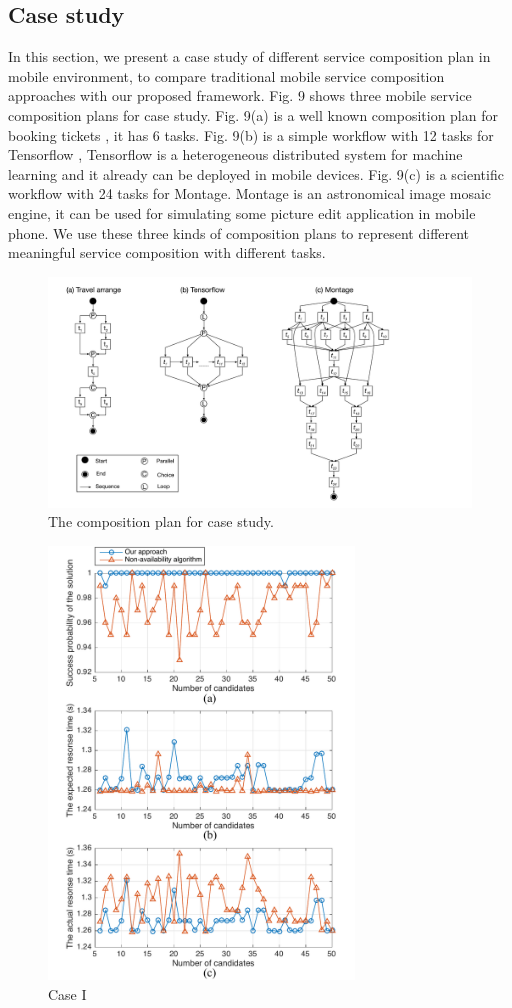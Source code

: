 \documentclass[10pt,journal,compsoc]{IEEEtran}
\begin{document}
\subsection{Case study}
In this section, we present a case study of different service composition plan in mobile environment, to compare traditional mobile service composition approaches with our proposed framework. Fig. 9 shows three mobile service composition plans for case study. Fig. 9(a) is a well known composition plan for booking tickets \cite{wu2013transactional}, it has 6 tasks. Fig. 9(b) is a simple workflow with 12 tasks for Tensorflow \cite{abadi2016tensorflow}, Tensorflow is a heterogeneous distributed system for machine learning and it already can be deployed in mobile devices. Fig. 9(c) is a scientific workflow with 24 tasks for Montage. Montage is an astronomical image mosaic engine, it can be used for simulating some picture edit application in mobile phone. We use these three kinds of composition plans to represent different meaningful service composition with different tasks.

\begin{figure}[!t]
\centering
\includegraphics[width=5in]{./img/DAG.pdf}
\caption{The composition plan for case study.}
\label{fig_DAG}
\end{figure}



\begin{figure}[!t]
\centering
\includegraphics[width=3.2in]{./img/Task-6.pdf}
\caption{Case I}
\label{Task-6}
\end{figure}
\end{document}
